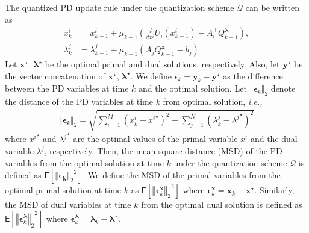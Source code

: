 \documentclass[10pt,twocolumn,twoside]{IEEEtran}
\begin{document}
The quantized PD update rule under the quantization scheme $\mathcal{Q}$ can be written as
\begin{align}\label{EQ: QU}
x^{i}_{k}&=x^{i}_{k-1}+\mu_{k-1} {\left({\frac{d }{d x^i}U_i{\left({x^i_{k-1}}\right)}-A^\top_i{\ensuremath{Q^{{{\ensuremath{\boldsymbol{{\lambda}}}}}}_{{k-1}}}}}\right)},\nonumber\\
\lambda^{j}_{k}&=\lambda^j_{k-1}+\mu_{k-1}{\left({\bar{A}_j{\ensuremath{Q^{{{\ensuremath{\boldsymbol{{x}}}}}}_{{k-1}}}}-b_j}\right)}
\end{align}
Let ${\ensuremath{\boldsymbol{{x}}}}^\star$, ${\ensuremath{\boldsymbol{{\lambda}}}}^\star$ be the optimal primal and dual solutions, respectively. Also, let  ${\ensuremath{\boldsymbol{{y}}}}^\star$ be the vector concatenation of  ${\ensuremath{\boldsymbol{{x}}}}^\star$, ${\ensuremath{\boldsymbol{{\lambda}}}}^\star$. We define $\epsilon_k={\ensuremath{\boldsymbol{{y}}}}_k-{\ensuremath{\boldsymbol{{y}}}}^\star$ as the difference between the PD variables at time $k$ and the optimal solution. Let ${\left\Vert{{\ensuremath{\boldsymbol{{\epsilon}}}}_k}\right\Vert_{{2}}}$ denote the distance of the PD variables at time $k$ from optimal solution, \emph{i.e.,}
\begin{eqnarray}
{\left\Vert{{\ensuremath{\boldsymbol{{\epsilon}}}}_k}\right\Vert_{{2}}}=\sqrt{\sum_{i=1}^M{\left({x^i_k-{x^i}^\star}\right)}^2+\sum_{j=1}^N{\left({\lambda^j_k-{\lambda^j}^\star}\right)}^2}
\end{eqnarray}
where ${x^i}^\star$ and ${\lambda^j}^\star$ are the optimal values of the primal variable $x^i$ and the dual variable $\lambda^j$, respectively. Then, the mean square distance (MSD) of the PD variables from the optimal solution at time $k$ under the quantization scheme $\mathcal{Q}$ is defined as ${\ensuremath{\mathsf{E}\left[{{\left\Vert{{\ensuremath{\boldsymbol{{\epsilon_k}}}}}\right\Vert_{{2}}}^2} \right]}}$. We define the MSD of the primal variables from the optimal primal solution at time $k$ as ${\ensuremath{\mathsf{E}\left[{{\left\Vert{{\ensuremath{\boldsymbol{{\epsilon}}}}_k^{{\ensuremath{\boldsymbol{{x}}}}}}\right\Vert_{{2}}}^2} \right]}}$ where ${\ensuremath{\boldsymbol{{\epsilon}}}}_k^{{\ensuremath{\boldsymbol{{x}}}}}={\ensuremath{\boldsymbol{{x}}}}_k-{\ensuremath{\boldsymbol{{x}}}}^\star$. Similarly, the MSD of dual variables at time $k$ from the optimal dual solution is defined as ${\ensuremath{\mathsf{E}\left[{{\left\Vert{{\ensuremath{\boldsymbol{{\epsilon}}}}_k^{{\ensuremath{\boldsymbol{{\lambda}}}}}}\right\Vert_{{2}}}^2} \right]}}$ where ${\ensuremath{\boldsymbol{{\epsilon}}}}_k^{{\ensuremath{\boldsymbol{{\lambda}}}}}={\ensuremath{\boldsymbol{{\lambda}}}}_k-{\ensuremath{\boldsymbol{{\lambda}}}}^\star$. 
 
\end{document}
